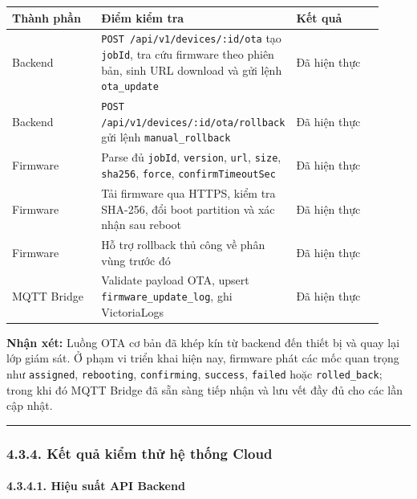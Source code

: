 \documentclass[13pt,a4paper]{extarticle}
\newcounter{none} %
\newcommand{\thesislongtableorignewline}{}
\let\thesislongtableorignewline\\
\renewcommand{\\}{\thesislongtableorignewline\hline}%
\let\\\thesislongtableorignewline
\begin{document}
{\def\LTcaptype{none} %
\begin{longtable}{|p{0.30\linewidth}|p{0.28\linewidth}|p{0.34\linewidth}|}
\hline \textbf{Thành phần} & \textbf{Điểm kiểm tra} & \textbf{Kết quả} \\
\hline
\endhead
\hline
\endlastfoot
Backend & \texttt{POST\ /api/v1/devices/:id/ota} tạo \texttt{jobId}, tra
cứu firmware theo phiên bản, sinh URL download và gửi lệnh
\texttt{ota\_update} & Đã hiện thực \\
Backend & \nolinkurl{POST /api/v1/devices/:id/ota/rollback} gửi lệnh
\texttt{manual\_rollback} & Đã hiện thực \\
Firmware & Parse đủ \texttt{jobId}, \texttt{version}, \texttt{url},
\texttt{size}, \texttt{sha256}, \texttt{force},
\texttt{confirmTimeoutSec} & Đã hiện thực \\
Firmware & Tải firmware qua HTTPS, kiểm tra SHA-256, đổi boot partition
và xác nhận sau reboot & Đã hiện thực \\
Firmware & Hỗ trợ rollback thủ công về phân vùng trước đó & Đã hiện
thực \\
MQTT Bridge & Validate payload OTA, upsert
\texttt{firmware\_update\_log}, ghi VictoriaLogs & Đã hiện thực \\
\end{longtable}
}

\textbf{Nhận xét:} Luồng OTA cơ bản đã khép kín từ backend đến thiết bị
và quay lại lớp giám sát. Ở phạm vi triển khai hiện nay, firmware phát
các mốc quan trọng như \texttt{assigned}, \texttt{rebooting},
\texttt{confirming}, \texttt{success}, \texttt{failed} hoặc
\texttt{rolled\_back}; trong khi đó MQTT Bridge đã sẵn sàng tiếp nhận và
lưu vết đầy đủ cho các lần cập nhật.

\begin{center}\rule{0.5\linewidth}{0.5pt}\end{center}

\subsubsection{4.3.4. Kết quả kiểm thử hệ thống
Cloud}\label{434-kux1ebft-quux1ea3-kiux1ec3m-thux1eed-hux1ec7-thux1ed1ng-cloud}

\paragraph{4.3.4.1. Hiệu suất API
Backend}\label{4341-hiux1ec7u-suux1ea5t-api-backend}
\end{document}
